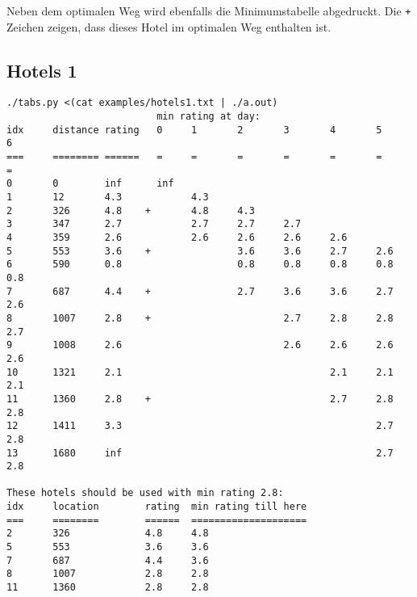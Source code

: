 \documentclass[a4paper,10pt,ngerman]{scrartcl}
\begin{document}
Neben dem optimalen Weg wird ebenfalls die Minimumstabelle abgedruckt.
Die \lstinline{+} Zeichen zeigen, dass dieses Hotel im optimalen Weg enthalten ist.

\subsection*{Hotels 1}
\begin{lstlisting}
./tabs.py <(cat examples/hotels1.txt | ./a.out)
                          min rating at day:
idx     distance rating   0     1       2       3       4       5       6
===     ======== ======   =     =       =       =       =       =       =
0       0        inf      inf
1       12       4.3            4.3
2       326      4.8    +       4.8     4.3
3       347      2.7            2.7     2.7     2.7
4       359      2.6            2.6     2.6     2.6     2.6
5       553      3.6    +               3.6     3.6     2.7     2.6
6       590      0.8                    0.8     0.8     0.8     0.8     0.8
7       687      4.4    +               2.7     3.6     3.6     2.7     2.6
8       1007     2.8    +                       2.7     2.8     2.8     2.7
9       1008     2.6                            2.6     2.6     2.6     2.6
10      1321     2.1                                    2.1     2.1     2.1
11      1360     2.8    +                               2.7     2.8     2.8
12      1411     3.3                                            2.7     2.8
13      1680     inf                                            2.7     2.8

These hotels should be used with min rating 2.8:
idx     location        rating  min rating till here
===     ========        ======  ====================
2       326             4.8     4.8
5       553             3.6     3.6
7       687             4.4     3.6
8       1007            2.8     2.8
11      1360            2.8     2.8
\end{lstlisting}
\end{document}
